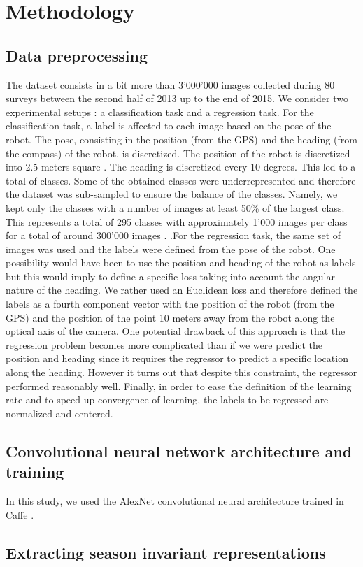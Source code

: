 \section{Methodology}

%

%

\subsection{Data preprocessing}


The dataset consists in a bit more than 3'000'000 images collected during 80 surveys between the second half of 2013 up to the end of 2015. We consider two experimental setups : a classification task and a regression task. For the classification task, a label is affected to each image based on the pose of the robot. The pose, consisting in the position (from the GPS) and the heading (from the compass) of the robot, is discretized. The position of the robot is discretized into 2.5 meters square . The heading is discretized every 10 degrees. This led to a total of  classes. Some of the obtained classes were underrepresented and therefore the dataset was sub-sampled to ensure the balance of the classes. Namely, we kept only the classes with a number of images at least 50\% of the largest class. This represents a total of 295 classes with approximately 1'000 images per class for a total of around 300'000 images . .For the regression task, the same set of images was used and the labels were defined from the pose of the robot. One possibility would have been to use the position and heading of the robot as labels but this would imply to define a specific loss taking into account the angular nature of the heading. We rather used an Euclidean loss and therefore defined the labels as a fourth component vector with the position of the robot (from the GPS) and the position of the point 10 meters away from the robot along the optical axis of the camera. One potential drawback of this approach is that the regression problem becomes more complicated than if we were predict the position and heading since it requires the regressor to predict a specific location along the heading. However it turns out that despite this constraint, the regressor performed reasonably well. Finally, in order to ease the definition of the learning rate and to speed up convergence of learning, the labels to be regressed are normalized and centered.


\subsection{Convolutional neural network architecture and training}

In this study, we used the AlexNet convolutional neural architecture \cite{NIPS2012_4824} trained in Caffe \cite{jia2014caffe}.


\subsection{Extracting season invariant representations}
